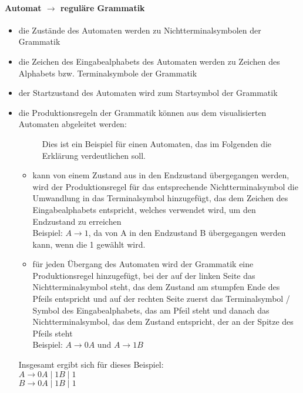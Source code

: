 \documentclass{article}
\begin{document}
	\paragraph{Automat $\rightarrow$ reguläre Grammatik}
	\begin{itemize}
		\item die Zustände des Automaten werden zu Nichtterminalsymbolen der Grammatik
		\item die Zeichen des Eingabealphabets des Automaten werden zu Zeichen des Alphabets bzw. Terminalsymbole der Grammatik
		\item der Startzustand des Automaten wird zum Startsymbol der Grammatik
		\item die Produktionsregeln der Grammatik können aus dem visualisierten Automaten abgeleitet werden: 
		\begin{figure}[H]
			\centering
			
			\caption{Dies ist ein Beispiel für einen Automaten, das im Folgenden die Erklärung verdeutlichen soll.}
		\end{figure}	
		\begin{itemize}
			\item kann von einem Zustand aus in den Endzustand übergegangen werden, wird der Produktionsregel für das entsprechende Nichtterminalsymbol die Umwandlung in das Terminalsymbol hinzugefügt, das dem Zeichen des Eingabealphabets entspricht, welches verwendet wird, um den Endzustand zu erreichen \\
			Beispiel: $A \rightarrow 1$, da von A in den Endzustand B übergegangen werden kann, wenn die 1 gewählt wird.
			\item für jeden Übergang des Automaten wird der Grammatik eine Produktionsregel hinzugefügt, bei der auf der linken Seite das Nichtterminalsymbol steht, das dem Zustand am stumpfen Ende des Pfeils entspricht und auf der rechten Seite zuerst das Terminalsymbol / Symbol des Eingabealphabets, das am Pfeil steht und danach das Nichtterminalsymbol, das dem Zustand entspricht, der an der Spitze des Pfeils steht \\
			Beispiel: $A \rightarrow 0A$ und $A \rightarrow 1B$
		\end{itemize}
		Insgesamt ergibt sich für dieses Beispiel: \\
		$A \rightarrow 0A \mid 1B \mid 1$ \\
		$B \rightarrow 0A \mid 1B \mid 1$
	\end{itemize}
	
\end{document}
